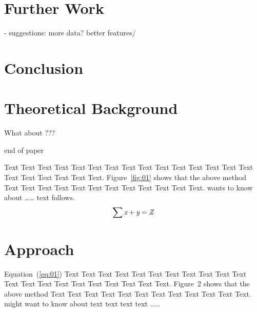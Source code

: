 \documentclass{bioinfo}
\begin{document}
\section{Further Work}
    - suggestions: more data? better features/

\section{Conclusion}

\section{Theoretical Background}

What about ???
















\newpage
end of paper
\newpage

Text Text Text Text Text Text  Text Text Text Text Text Text Text
Text Text  Text Text Text Text Text Text. Figure~\ref{fig:01}
shows that the above method  Text Text Text Text  Text Text Text
Text Text Text  Text Text.  \citep{Bag01} wants to know about
{\ldots}{\ldots} text follows.
\begin{equation}
\sum \text{\it x}+ \text{\it y} =\text{\it Z}\label{eq:01}\vspace*{-10pt}
\end{equation}


\section{Approach}

Equation~(\ref{eq:01}) Text Text Text Text Text Text  Text Text
Text Text Text Text Text Text Text Text Text Text Text Text Text.
Figure~2\vphantom{\ref{fig:02}} shows that the above method  Text
Text Text Text  Text Text Text Text Text Text  Text Text.
\citealp{Boffelli03} might want to know about text text text text
.....
\end{document}
